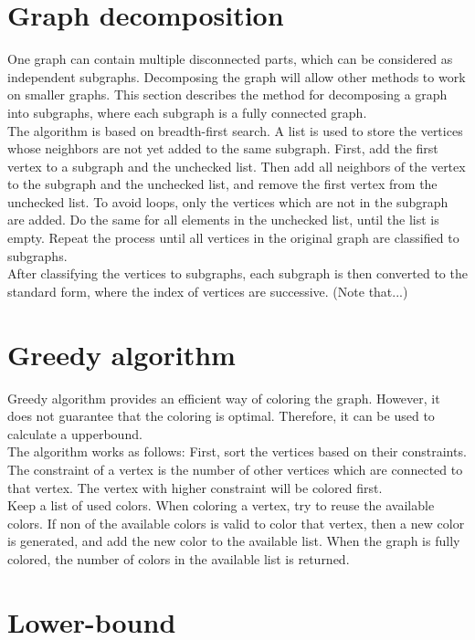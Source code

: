 \documentclass[a4paper]{report}
\begin{document}
		\section{Graph decomposition}
		One graph can contain multiple disconnected parts, which can be considered as independent subgraphs. Decomposing the graph will allow other methods to work on smaller graphs. This section describes the method for decomposing a graph into subgraphs, where each subgraph is a fully connected graph.\\
		The algorithm is based on breadth-first search. A list is used to store the vertices whose neighbors are not yet added to the same subgraph. First, add the first vertex to a subgraph and the unchecked list. Then add all neighbors of the vertex to the subgraph and the unchecked list, and remove the first vertex from the unchecked list. To avoid loops, only the vertices which are not in the subgraph are added. Do the same for all elements in the unchecked list, until the list is empty. Repeat the process until all vertices in the original graph are classified to subgraphs.\\
		After classifying the vertices to subgraphs, each subgraph is then converted to the standard form, where the index of vertices are successive.
		(Note that...)
		
		\section{Greedy algorithm}
		Greedy algorithm provides an efficient way of coloring the graph. However,  it does not guarantee that the coloring is optimal. Therefore, it can be used to calculate a upperbound. \\
		The algorithm works as follows:
		First, sort the vertices based on their constraints. The constraint of a vertex is  the number of other vertices which are connected to that vertex. The vertex with higher constraint will be colored first.\\
		Keep a list of used colors. When coloring a vertex, try to reuse the available colors. If non of the available colors is valid to color that vertex, then  a new color is generated, and add the new color to the available list. When the graph is fully colored, the number of colors in the available list is returned.\\
		
		\section{Lower-bound}
		
\end{document}
